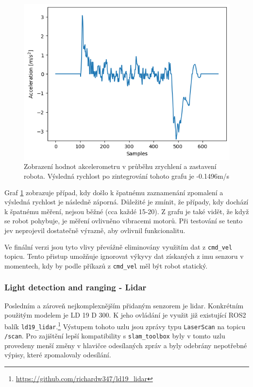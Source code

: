\begin{figure}[h!]
	\centering
	\includegraphics[scale=0.75]{obrazky-figures/accelerometer_graph.png}
	\caption[Graf výstupních hodnot akcelerometru]{Zobrazení hodnot akcelerometru v průběhu zrychlení a zastavení robota. Výsledná rychlost po zintegrování tohoto grafu je -0.1496m/s}
	\label{fig:accel_readings}
\end{figure}
Graf \ref{fig:accel_readings} zobrazuje případ, kdy došlo k špatnému zaznamenání zpomalení a výsledná rychlost je následně záporná. Důležité je zmínit, že případy, kdy dochází k špatnému měření, nejsou běžné (cca každé 15-20). Z grafu je také vidět, že když se robot pohybuje, je měření ovlivněno vibracemi motorů. Při testování se tento jev neprojevil dostatečně výrazně, aby ovlivnil funkcionalitu.

Ve finální verzi jsou tyto vlivy převážně eliminovány využitím dat z \verb|cmd_vel| topicu. Tento přistup umožňuje ignorovat výkyvy dat získaných z imu senzoru v momentech, kdy by podle příkazů z \verb|cmd_vel| měl být robot statický.

\subsubsection*{Light detection and ranging - Lidar}
Posledním a zároveň nejkomplexnějším přidaným senzorem je lidar. Konkrétním použitým modelem je LD 19 D 300. K jeho ovládání je využit již existující ROS2 balík \verb|ld19_lidar|.\footnote{\url{https://github.com/richardw347/ld19_lidar}} Výstupem tohoto uzlu jsou zprávy typu \verb|LaserScan| na topicu \verb|/scan|. Pro zajištění lepší kompatibility s \verb|slam_toolbox| byly v tomto uzlu provedeny menší změny v hlavičce odesílaných zpráv a byly odebrány nepotřebné výpisy, které zpomalovaly odesílání.

